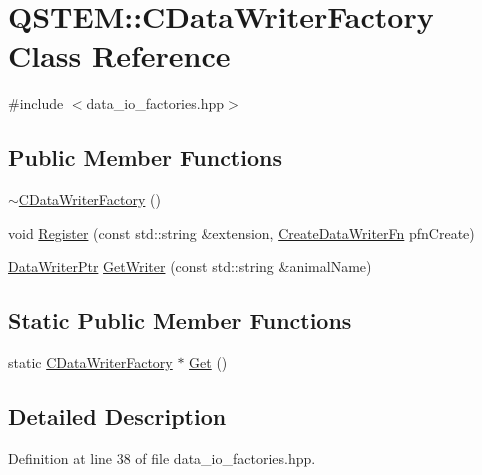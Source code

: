 \hypertarget{class_q_s_t_e_m_1_1_c_data_writer_factory}{\section{Q\-S\-T\-E\-M\-:\-:C\-Data\-Writer\-Factory Class Reference}
\label{class_q_s_t_e_m_1_1_c_data_writer_factory}
}


{\ttfamily \#include $<$data\-\_\-io\-\_\-factories.\-hpp$>$}

\subsection*{Public Member Functions}
\begin{DoxyCompactItemize}
\item 
\hyperlink{class_q_s_t_e_m_1_1_c_data_writer_factory_a01a8fb2f752c11d47c6521f904d8671c}{$\sim$\-C\-Data\-Writer\-Factory} ()
\item 
void \hyperlink{class_q_s_t_e_m_1_1_c_data_writer_factory_a8a531138f1ae44c987c03b26c7cf82b1}{Register} (const std\-::string \&extension, \hyperlink{namespace_q_s_t_e_m_aae795ff3e7acb0931b3dc001b547c004}{Create\-Data\-Writer\-Fn} pfn\-Create)
\item 
\hyperlink{namespace_q_s_t_e_m_a370bd18d36890fd91e04bf74b84bc02a}{Data\-Writer\-Ptr} \hyperlink{class_q_s_t_e_m_1_1_c_data_writer_factory_a8645941ba6a917d20b4b9c3ecd29c1c9}{Get\-Writer} (const std\-::string \&animal\-Name)
\end{DoxyCompactItemize}
\subsection*{Static Public Member Functions}
\begin{DoxyCompactItemize}
\item 
static \hyperlink{class_q_s_t_e_m_1_1_c_data_writer_factory}{C\-Data\-Writer\-Factory} $\ast$ \hyperlink{class_q_s_t_e_m_1_1_c_data_writer_factory_ad59ce70633c095bc9c73de8db18f98f2}{Get} ()
\end{DoxyCompactItemize}


\subsection{Detailed Description}


Definition at line 38 of file data\-\_\-io\-\_\-factories.\-hpp.



